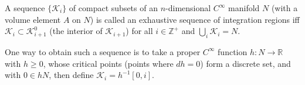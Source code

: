 A sequence $\{\mathcal{K}_i\}$ of compact subsets of an $n$-dimensional $C^\infty$ manifold $N$ (with a volume element $A$ on $N$) is called an exhaustive sequence of integration regions iff $\mathcal{K}_i \subset \mathcal{K}_{i+1}^0$ (the interior of $\mathcal{K}_{i+1}$) for all $i \in \mathbb{Z}^+$ and $\bigcup_i \mathcal{K}_i = N$.

One way to obtain such a sequence is to take a proper $C^\infty$ function $h: N \to \mathbb{R}$ with $h \geq 0$, whose critical points (points where $dh = 0$) form a discrete set, and with $0 \in hN$, then define $\mathcal{K}_i = h^{-1}[0, i]$.
